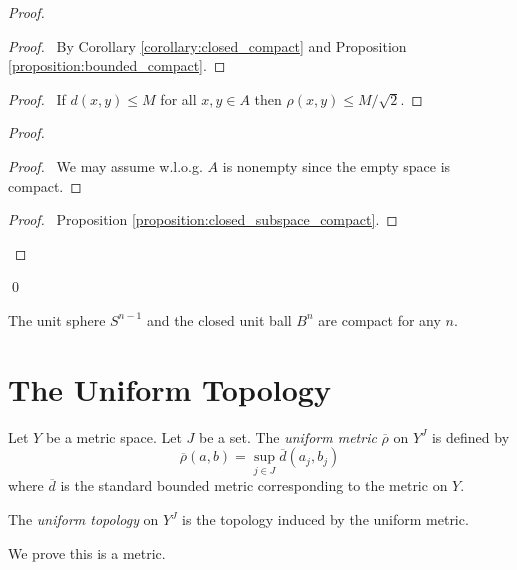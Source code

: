 \begin{proof}
    \pf
    \begin{proof}
        \pf\ By Corollary \ref{corollary:closed_compact} and Proposition \ref{proposition:bounded_compact}.
    \end{proof}
    \begin{proof}
        \pf\ If $d(x,y) \leq M$ for all $x,y \in A$ then $\rho(x,y) \leq M / \sqrt{2}$.
    \end{proof}
    \begin{proof}
        \begin{proof}
            \pf\ We may assume w.l.o.g. $A$ is nonempty since the empty space is compact.
        \end{proof}
        \begin{proof}
            \pf\ Proposition \ref{proposition:closed_subspace_compact}.
        \end{proof}
    \end{proof}
    \qed
\end{proof}

\begin{corollary}
    The unit sphere $S^{n-1}$ and the closed unit ball $B^n$ are compact for any $n$.
\end{corollary}

\section{The Uniform Topology}

\begin{definition}
    Let $Y$ be a metric space.
    Let $J$ be a set. The \emph{uniform metric} $\overline{\rho}$ on $Y^J$ is defined by
    \[ \overline{\rho}(a,b) = \sup_{j \in J} \overline{d}(a_j, b_j) \]
    where $\overline{d}$ is the standard bounded metric corresponding to the metric on $Y$.

    The \emph{uniform topology} on $Y^J$ is the topology induced by the uniform metric.
\end{definition}

We prove this is a metric.

